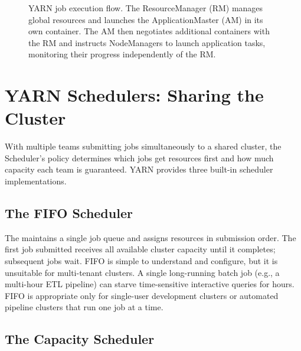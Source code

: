 \begin{figure}[h!t]
\caption{YARN job execution flow. The ResourceManager (RM) manages global
         resources and launches the ApplicationMaster (AM) in its own container.
         The AM then negotiates additional containers with the RM and instructs
         NodeManagers to launch application tasks, monitoring their progress
         independently of the RM.}
\label{fig:yarn-flow}
\end{figure}

\section{YARN Schedulers: Sharing the Cluster}
\label{sec:schedulers}

With multiple teams submitting jobs simultaneously to a shared cluster,
the Scheduler's policy determines which jobs get resources first and
how much capacity each team is guaranteed. YARN provides three built-in
scheduler implementations.

\subsection{The FIFO Scheduler}
\label{subsec:fifo-sched}

The  maintains a single job
queue and assigns resources in submission order. The first job submitted
receives all available cluster capacity until it completes; subsequent
jobs wait. FIFO is simple to understand and configure, but it is
unsuitable for multi-tenant clusters. A single long-running batch job
(e.g., a multi-hour ETL pipeline) can starve time-sensitive interactive
queries for hours. FIFO is appropriate only for single-user development
clusters or automated pipeline clusters that run one job at a time.

\subsection{The Capacity Scheduler}
\label{subsec:capacity-sched}

